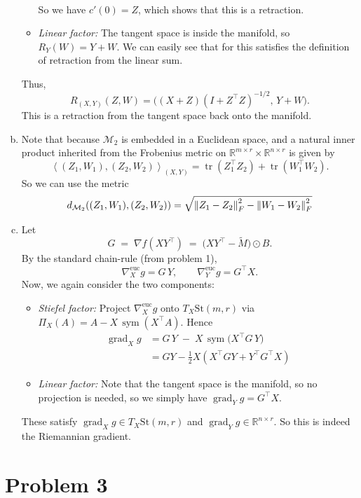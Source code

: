 \documentclass[11pt]{scrartcl}
\newcommand{\St}{\mathrm{St}}
\newcommand{\R}{\mathbb{R}}
\newcommand{\grad}{\operatorname{grad}}
\newcommand{\sym}{\operatorname{sym}}
\newcommand{\tr}{\operatorname{tr}}
\begin{document}
\begin{enumerate}[(a)]
\begin{itemize}
\begin{align*}
        \end{align*}
        So we have $c'(0) = Z$, which shows that this is a retraction.
      \item \emph{Linear factor:} The tangent space is inside the manifold, so \(R_Y(W)=Y+W\). We can easily see that for this satisfies the definition of retraction from the linear sum.
    \end{itemize}
    Thus, \[R_{(X,Y)}(Z,W) = \bigl((X+Z)(I + Z^\top Z)^{-1/2},\,Y+W\bigr).\]
    This is a retraction from the tangent space back onto the manifold.
    \item Note that because $\mathcal M_2$ is embedded in a Euclidean space, and a natural inner product inherited from the Frobenius metric on \(\R^{m\times r}\times\R^{n\times r}\) is given by \[\left\langle (Z_1,W_1),(Z_2,W_2)\right\rangle _{(X,Y)}= \tr(Z_1^{\top}Z_2) + \tr(W_1^{\top}W_2).\]
    So we can use the metric \[d_{\mathcal M_2}((Z_1,W_1),(Z_2,W_2)) = \sqrt{\left\lVert Z_1-Z_2 \right\rVert_F^2 - \left\lVert W_1-W_2 \right\rVert_F^2}\]
    \item Let
    \[
    G \;=\;\nabla f(XY^{\!\top})
           \;=\;\bigl(XY^{\!\top}-\widetilde M\bigr)\odot B.
    \]
    By the standard chain-rule (from problem 1),
    \[
    \nabla_X^{\mathrm {euc}}g = G\,Y,
    \qquad
    \nabla_Y^{\mathrm {euc}}g = G^{\top}X.
    \]
    Now, we again consider the two components: \begin{itemize}
        \item \emph{Stiefel factor:} Project \(\nabla_X^{\mathrm {euc}}g\) onto \(T_X\St(m,r)\) via
        \(\Pi_X(A) = A - X\,\sym(X^{\top}A)\). Hence \begin{align*}
            \grad_X g &= G\,Y \;-\; X\,\sym\bigl(X^{\top}G\,Y\bigr) \\
            &= GY - \tfrac 12 X (X^\top GY + Y^\top G^\top X)
        \end{align*}
        \item \emph{Linear factor:} Note that the tangent space is the manifold, so no projection is needed, so we simply have $\grad_Y g= G^{\top}X.$
    \end{itemize}
    
    These satisfy \(\grad_X g\in T_X\St(m,r)\) and \(\grad_Y g\in\R^{n\times r}\). So this is indeed the Riemannian gradient.
\end{enumerate}

\newpage

\section{Problem 3}
\end{document}
